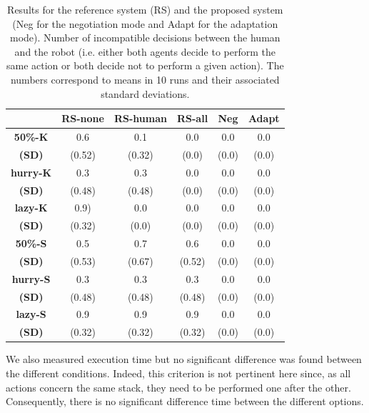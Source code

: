 \documentclass[english,a4paper,11pt,twoside]{StyleThese}
\begin{document}
\begin{table}[!h]
  \begin{tabular}{|c||c|c|c|c|c||}
  \hline
     & \textbf{RS-none} & \textbf{RS-human} & \textbf{RS-all} & \textbf{Neg} & \textbf{Adapt} \\
  \hline
  \hline
     \textbf{50\%-K} & 0.6 & 0.1 & 0.0 & 0.0 & 0.0 \\
     \textbf{(SD)} & (0.52) & (0.32) & (0.0) & (0.0) & (0.0) \\
  \hline
     \textbf{hurry-K} & 0.3 & 0.3 & 0.0 & 0.0 & 0.0 \\
     \textbf{(SD)} & (0.48) & (0.48) & (0.0) & (0.0) & (0.0) \\
  \hline
     \textbf{lazy-K} & 0.9) & 0.0 & 0.0 & 0.0 & 0.0 \\
     \textbf{(SD)} & (0.32) & (0.0) & (0.0) & (0.0) & (0.0) \\
  \hline
     \textbf{50\%-S} & 0.5 & 0.7 & 0.6 & 0.0 & 0.0 \\
     \textbf{(SD)} & (0.53) & (0.67) & (0.52) & (0.0) & (0.0) \\
  \hline
     \textbf{hurry-S} & 0.3 & 0.3 & 0.3 & 0.0 & 0.0 \\
     \textbf{(SD)} & (0.48) & (0.48) & (0.48) & (0.0) & (0.0) \\
  \hline
     \textbf{lazy-S} & 0.9 & 0.9 & 0.9 & 0.0 & 0.0 \\
     \textbf{(SD)} & (0.32) & (0.32) & (0.32) & (0.0) & (0.0) \\
  \hline
  \end{tabular}
   \caption{Results for the reference system (RS) and the proposed system (Neg for the negotiation mode and Adapt for the adaptation mode). Number of incompatible decisions between the human and the robot (i.e. either both agents decide to perform the same action or both decide not to perform a given action). The numbers correspond to means in 10 runs and their associated standard deviations.}
   \label{tab:incompatible} 
\end{table}

We also measured execution time but no significant difference was found between the different conditions. Indeed, this criterion is not pertinent here since, as all actions concern the same stack, they need to be performed one after the other. Consequently, there is no significant difference time between the different options.
\end{document}
